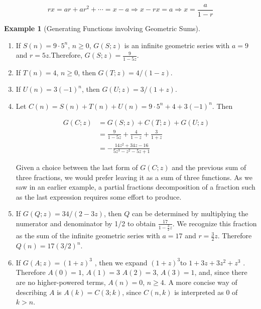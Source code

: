 \documentclass[10pt,]{book}
\theoremstyle{plain}
\theoremstyle{definition}
\theoremstyle{definition}
\theoremstyle{definition}
\newtheorem{example}[theorem]{Example}
\theoremstyle{definition}
\numberwithin{equation}{section}
\begin{document}
\begin{equation*}r x =a r+ ar^2 +\cdots = x- a \Rightarrow x-rx=a \Rightarrow x=  \frac{a}{1-r}\end{equation*}
%
\begin{example}[Generating Functions involving Geometric Sums]\label{ex-geometric-sums}
\leavevmode%
\begin{enumerate}[label=\alph*]
\item\hypertarget{li-148}{} If \(S(n) = 9\cdot 5^n\), \(n \geq  0\), \(G(S;z)\) is an infinite geometric series with \(a = 9\) and \(r = 5z\).Therefore,  \(G(S;z) = \frac{9}{1 - 5z}\).%
\item\hypertarget{li-149}{} If \(T(n) = 4\), \(n \geq\)0, then \(G(T;z) = 4/(1 - z)\).%
\item\hypertarget{li-150}{}If \(U(n) = 3(-1)^n\), then \(G(U;z) = 3/(1 + z)\).%
\item\hypertarget{li-151}{}Let \(C(n) = S(n) + T(n) + U(n) = 9 \cdot  5^n + 4 + 3(-1)^n\).  Then

\begin{equation*}
\begin{split}
G(C;z) & = G(S;z) + C(T;z) + G(U;z)\\
		& = \frac{9}{1-5z} + \frac{4}{1-z}+ \frac{3}{1+z}\\
		& = -\frac{14 z^2+34z-16}{5 z^3-z^2-5 z+1}
\end{split}
\end{equation*}%
\par
Given a choice between the last form of \(G(C;z)\) and the previous sum of three fractions, we would prefer leaving it as a sum of three functions.
As we saw in an earlier example, a partial fractions decomposition of a fraction such as the last expression requires some effort to produce.%
\item\hypertarget{li-152}{} If \(G(Q;z) = 34/(2 - 3z)\), then \(Q\) can be determined by multiplying the numerator and denominator by 1/2 to obtain \(\frac{17}{1-\frac{3}{2}z}\).
We recognize this fraction as the sum of the infinite geometric series with \(a = 17\) and \(r = \frac{3}{2}z\). Therefore \(Q(n) = 17(3/2)^n\).%
\item\hypertarget{li-153}{}If \(G(A;z) = (1 + z)^3\) , then we expand \((1 + z)^3\)to \(1 + 3z + 3z^2 + z^{3}\) . Therefore \(A(0) = 1\), \(A(1) = 3\) \(A(2)= 3\), \(A(3) = 1\), and, since there are no higher-powered terms, \(A(n) = 0\), \(n \geq  4\). A more concise way of describing \(A\) is \(A(k)
= C(3;k)\), since \(C(n,k)\) is interpreted as 0 of \(k > n\).
%
\end{enumerate}
%
\end{example}
\end{document}
